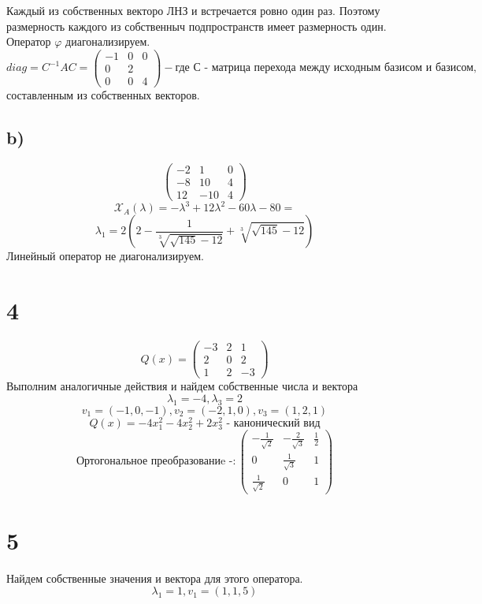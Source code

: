 	 	Каждый из собственных векторо ЛНЗ и встречается ровно один раз. Поэтому размерность каждого из собственныч подпространств имеет размерность один. 
	 	Оператор $\varphi $ диагонализируем. 
	 	$$diag = C^{-1}AC = \begin{pmatrix}
	 			-1 & 0 & 0\\
	 			0 & 2 & \\
	 			0 & 0 & 4 
	 	\end{pmatrix} - \text{где С - матрица перехода между исходным базисом и базисом,}$$
	 	 составленным из собственных векторов. 
	 	 \subsection*{b)}
	 	 $$\begin{pmatrix}
	 	 	-2 & 1 & 0 \\
	 	 	-8 & 10 & 4 \\
	 	 	12 & -10 & 4
	 	 \end{pmatrix}$$
	 	 $$\mathcal{X}_A(\lambda) =-\lambda^3 + 12 \lambda^2-60\lambda -80 = $$
	 	 $$\lambda_1 = 2\left(2- \frac{1}{\sqrt[3]{\sqrt{145}-12}} + \sqrt[3]{\sqrt{145}-12}\right)$$
	 	 Линейный оператор не диагонализируем. 
	 	 \section*{4}
	 	 $$Q(x) = \begin{pmatrix}
	 	 	-3  & 2 & 1\\
	 	 	2 & 0 & 2\\
	 	 	1 & 2 & -3 
	 	 \end{pmatrix}$$
	 	 Выполним аналогичные действия и найдем собственные числа и вектора
	 	 $$\lambda_1 = -4, \lambda_3 =2$$
	 	 $$v_1  = (-1, 0, -1 ), v_2 = (-2, 1, 0), v_3 = (1, 2, 1)$$
	 	 $$Q(x) = -4x^2_1-4x^2_2 + 2x^2_3  \text{ - канонический вид}$$
	 	$$ \text{Ортогональное преобразованиe -}\colon \begin{pmatrix}
	 		-\frac{1}{\sqrt2}& -\frac{2}{\sqrt3} & \frac12\\
	 		0 & \frac{1}{\sqrt3} & 1\\
	 		\frac{1}{\sqrt2}  & 0 & 1
	 	\end{pmatrix}$$
	 	\section*{5}
	 	Найдем собственные значения и вектора для этого оператора. 
	 	$$\lambda_1=1, v_1 = (1,1,5)$$
	 	
